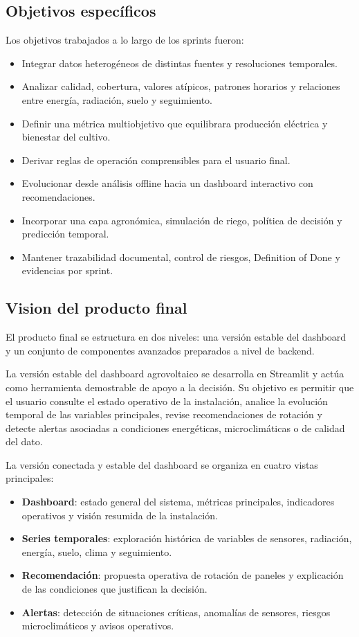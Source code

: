﻿\documentclass[11pt,a4paper]{article}
\begin{document}
\subsection{Objetivos específicos}

Los objetivos trabajados a lo largo de los sprints fueron:

\begin{itemize}
    \item Integrar datos heterogéneos de distintas fuentes y resoluciones temporales.
    \item Analizar calidad, cobertura, valores atípicos, patrones horarios y relaciones entre energía, radiación, suelo y seguimiento.
    \item Definir una métrica multiobjetivo que equilibrara producción eléctrica y bienestar del cultivo.
    \item Derivar reglas de operación comprensibles para el usuario final.
    \item Evolucionar desde análisis offline hacia un dashboard interactivo con recomendaciones.
    \item Incorporar una capa agronómica, simulación de riego, política de decisión y predicción temporal.
    \item Mantener trazabilidad documental, control de riesgos, Definition of Done y evidencias por sprint.
\end{itemize}

\subsection{Vision del producto final}

El producto final se estructura en dos niveles: una versión estable del dashboard y un conjunto de componentes avanzados preparados a nivel de backend.

La versión estable del dashboard agrovoltaico se desarrolla en Streamlit y actúa como herramienta demostrable de apoyo a la decisión. Su objetivo es permitir que el usuario consulte el estado operativo de la instalación, analice la evolución temporal de las variables principales, revise recomendaciones de rotación y detecte alertas asociadas a condiciones energéticas, microclimáticas o de calidad del dato.

La versión conectada y estable del dashboard se organiza en cuatro vistas principales:

\begin{itemize}
    \item \textbf{Dashboard}: estado general del sistema, métricas principales, indicadores operativos y visión resumida de la instalación.
    \item \textbf{Series temporales}: exploración histórica de variables de sensores, radiación, energía, suelo, clima y seguimiento.
    \item \textbf{Recomendación}: propuesta operativa de rotación de paneles y explicación de las condiciones que justifican la decisión.
    \item \textbf{Alertas}: detección de situaciones críticas, anomalías de sensores, riesgos microclimáticos y avisos operativos.
\end{itemize}
\end{document}
